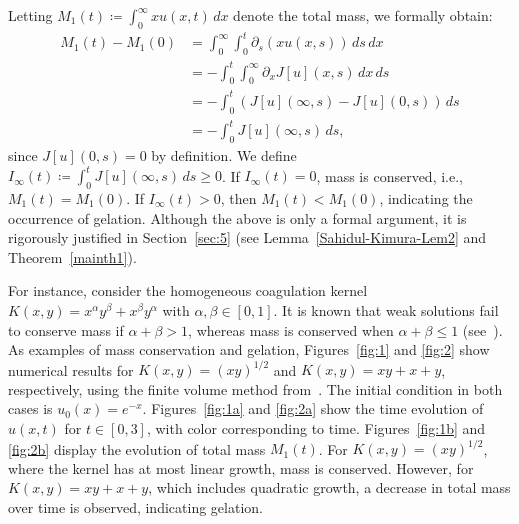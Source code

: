 \documentclass[a4paper,11pt]{article}
\begin{document}
Letting $M_1(t) \coloneqq \int_0^\infty x u(x,t)\,dx$ denote the total mass, we formally obtain:
\begin{align*}
M_1(t) - M_1(0)
&= \int_0^\infty \int_0^t \partial_s(xu(x,s))\,ds\,dx\\
&= -\int_0^t \int_0^\infty \partial_x J[u](x,s)\,dx\,ds\\
&= -\int_0^t (J[u](\infty,s) - J[u](0,s))\,ds\\
&= -\int_0^t J[u](\infty,s)\,ds,
\end{align*}
since $J[u](0,s) = 0$ by definition. We define $I_\infty(t) \coloneqq \int_0^t J[u](\infty,s)\,ds \ge 0$. If $I_\infty(t) = 0$, mass is conserved, i.e., $M_1(t) = M_1(0)$. If $I_\infty(t) > 0$, then $M_1(t) < M_1(0)$, indicating the occurrence of gelation. Although the above is only a formal argument, it is rigorously justified in Section~\ref{sec:5} (see Lemma~\ref{Sahidul-Kimura-Lem2} and Theorem~\ref{mainth1}).

For instance, consider the homogeneous coagulation kernel $K(x, y) = x^\alpha y^\beta + x^\beta y^\alpha$ with $\alpha, \beta \in [0, 1]$. It is known that weak solutions fail to conserve mass if $\alpha + \beta > 1$, whereas mass is conserved when $\alpha + \beta \le 1$ (see~\cite{E-L-M-P2003}).  
As examples of mass conservation and gelation, Figures~\ref{fig:1} and \ref{fig:2} show numerical results for $K(x, y) = (xy)^{1/2}$ and $K(x, y) = xy + x + y$, respectively, using the finite volume method from~\cite{Filbet-Laurencot2004}. The initial condition in both cases is $u_0(x) = e^{-x}$. Figures~\ref{fig:1a} and \ref{fig:2a} show the time evolution of $u(x,t)$ for $t \in [0,3]$, with color corresponding to time. Figures~\ref{fig:1b} and \ref{fig:2b} display the evolution of total mass $M_1(t)$. For $K(x, y) = (xy)^{1/2}$, where the kernel has at most linear growth, mass is conserved. However, for $K(x, y) = xy + x + y$, which includes quadratic growth, a decrease in total mass over time is observed, indicating gelation.
\end{document}
